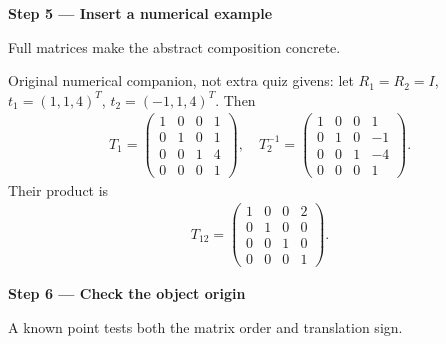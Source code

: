 \documentclass[letterpaper,11pt,english,openany,oneside]{jupyterBook}
\begin{document}
\par\medskip{}
{\color{QuizStepRed}\bfseries Step 5 — Insert a numerical example}\par\smallskip

\sphinxAtStartPar
{} Full matrices make the abstract composition concrete.

\sphinxAtStartPar
Original numerical companion, not extra quiz givens: let {\color{QuizMathBlue} \(R_1=R_2=I\)}, {\color{QuizMathBlue} \(t_1=(1,1,4)^T\)}, {\color{QuizMathBlue} \(t_2=(-1,1,4)^T\)}. Then
{\color{QuizMathBlue} \begin{equation*}
\begin{split}
T_1=\begin{pmatrix}1&0&0&1\\0&1&0&1\\0&0&1&4\\0&0&0&1\end{pmatrix},\quad
T_2^{-1}=\begin{pmatrix}1&0&0&1\\0&1&0&-1\\0&0&1&-4\\0&0&0&1\end{pmatrix}.
\end{split}
\end{equation*}}
\sphinxAtStartPar
Their product is
{\color{QuizMathBlue} \begin{equation*}
\begin{split}
T_{12}=\begin{pmatrix}1&0&0&2\\0&1&0&0\\0&0&1&0\\0&0&0&1\end{pmatrix}.
\end{split}
\end{equation*}}
\par

\par\medskip{}
{\color{QuizStepRed}\bfseries Step 6 — Check the object origin}\par\smallskip

\sphinxAtStartPar
{} A known point tests both the matrix order and translation sign.
\end{document}
